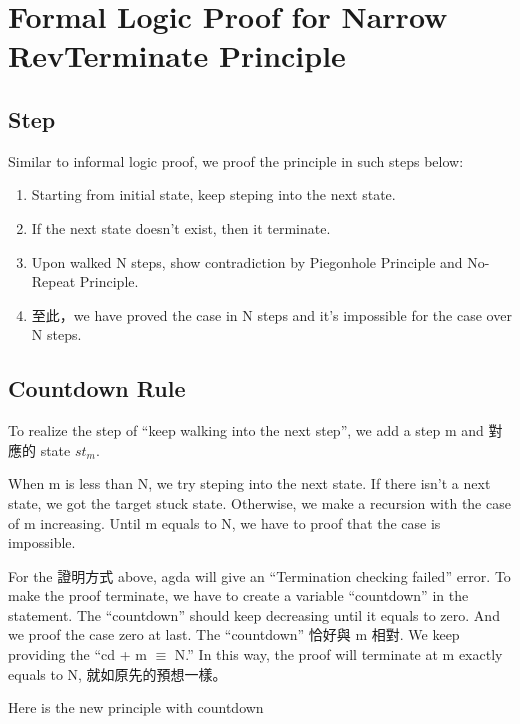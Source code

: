 \section{Formal Logic Proof for Narrow RevTerminate Principle}

\subsection{ Step }


Similar to informal logic proof, we proof the principle in such steps below:
\begin{enumerate}[1.]
    \item Starting from initial state, keep steping into the next state.
    \item If the next state doesn't exist, then it terminate.
    \item Upon walked N steps, show contradiction by Piegonhole Principle and No-Repeat Principle.
    \item 至此，we have proved the case in N steps and it's impossible for the case over N steps.
\end{enumerate}

\subsection{ Countdown Rule }
To realize the step of ``keep walking into the next step'', we add a step m and 對應的 state $st_{m}$.



When m is less than N, we try steping into the next state.  If there isn't a next state, we got the target stuck state.  Otherwise, we make a recursion with the case of m increasing.
Until m equals to N, we have to proof that the case is impossible.


For the 證明方式 above, agda will give an ``Termination checking failed'' error.
To make the proof terminate, we have to create a variable ``countdown'' in the statement.  The ``countdown'' should keep decreasing until it equals to zero.  And we proof the case zero at last.
The ``countdown'' 恰好與 m 相對.  We keep providing the ``cd + m $\equiv$ N.''  In this way, the proof will terminate at m exactly equals to N, 就如原先的預想一樣。

Here is the new principle with countdown


